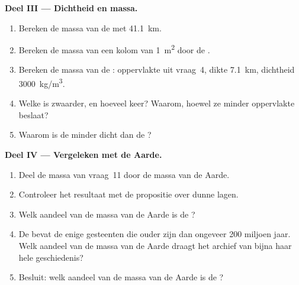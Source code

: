 \begin{problem}
\medskip
\noindent\textbf{Deel III --- Dichtheid en massa.}
\begin{enumerate}[resume]
  \item Bereken de massa van de  met \qty{41.1}{km}.
  \item Bereken de massa van een kolom van \qty{1}{m^2} door de .
  \item Bereken de massa van de : oppervlakte uit vraag~4,
        dikte \qty{7.1}{km}, dichtheid \qty{3000}{kg/m^3}.
  \item Welke is zwaarder, en hoeveel keer? Waarom, hoewel ze minder
        oppervlakte beslaat?
  \item Waarom is de  minder dicht dan de ?
\end{enumerate}

\medskip
\noindent\textbf{Deel IV --- Vergeleken met de Aarde.}
\begin{enumerate}[resume]
  \item Deel de massa van vraag~11 door de massa van de Aarde.
  \item Controleer het resultaat met de propositie over dunne lagen.
  \item Welk aandeel van de massa van de Aarde is de ?
  \item De  bevat de enige gesteenten die ouder zijn dan ongeveer 200
        miljoen jaar. Welk aandeel van de massa van de Aarde draagt het archief van
        bijna haar hele geschiedenis?
  \item Besluit: welk aandeel van de massa van de Aarde is de ?
\end{enumerate}
\end{problem}
